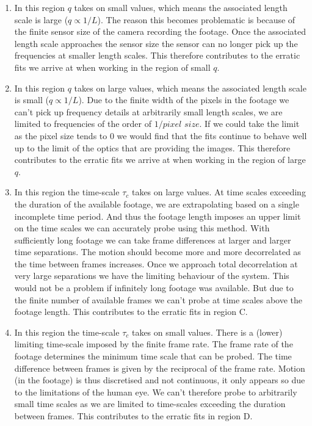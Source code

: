 \documentclass[10pt]{article}
\begin{document}
\begin{enumerate}[label=(\Alph*)]
\item In this region $q$ takes on small values, which means the associated length scale is large ($q \propto 1 / L$). The reason this becomes problematic is because of the finite sensor size of the camera recording the footage. Once the associated length scale approaches the sensor size the sensor can no longer pick up the frequencies at smaller length scales. This therefore contributes to the erratic fits we arrive at when working in the region of small $q$.
     
\item In this region $q$ takes on large values, which means the associated length scale is small ($q \propto 1 / L$). Due to the finite width of the pixels in the footage we can't pick up frequency details at arbitrarily small length scales, we are limited to frequencies of the order of $1 / pixel$ $size$. If we could take the limit as the pixel size tends to 0 we would find that the fits continue to behave well up to the limit of the optics that are providing the images. This therefore contributes to the erratic fits we arrive at when working in the region of large $q$.

\item In this region the time-scale $\tau_c$ takes on large values. At time scales exceeding the duration of the available footage, we are extrapolating based on a single incomplete time period. And thus the footage length imposes an upper limit on the time scales we can accurately probe using this method. With sufficiently long footage we can take frame differences at larger and larger time separations. The motion should become more and more decorrelated as the time between frames increases. Once we approach total decorrelation at very large separations we have the limiting behaviour of the system. This would not be a problem if infinitely long footage was available. But due to the finite number of available frames we can't probe at time scales above the footage length. This contributes to the erratic fits in region C.

\item In this region the time-scale $\tau_c$ takes on small values. There is a (lower) limiting time-scale imposed by the finite frame rate. The frame rate of the footage determines the minimum time scale that can be probed. The time difference between frames is given by the reciprocal of the frame rate. Motion (in the footage) is thus discretised and not continuous, it only appears so due to the limitations of the human eye. We can't therefore probe to arbitrarily small time scales as we are limited to time-scales exceeding the duration between frames. This contributes to the erratic fits in region D.


\end{enumerate}
\end{document}
